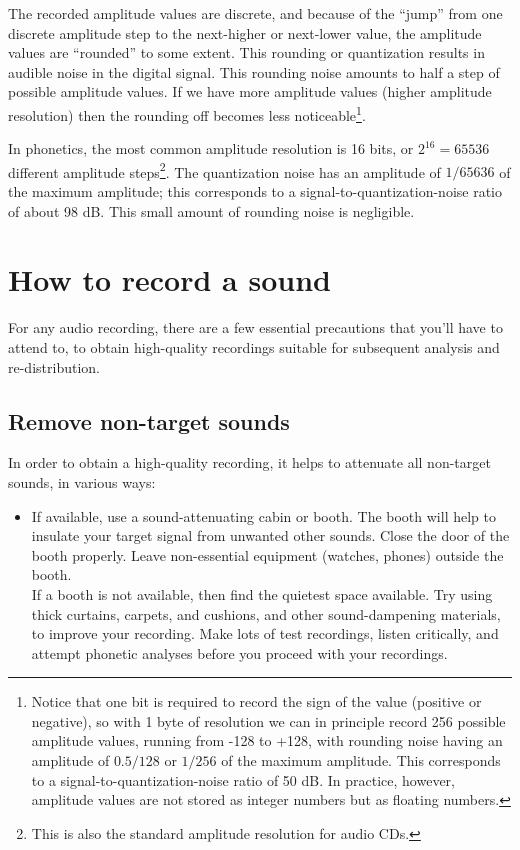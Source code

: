\documentclass[
]{book}
\providecommand{\tightlist}{%
  \setlength{\itemsep}{0pt}\setlength{\parskip}{0pt}}
\begin{document}
The recorded amplitude values are discrete, and because of the ``jump'' from one discrete amplitude step to the next-higher or next-lower value, the amplitude values are ``rounded'' to some extent. This rounding or quantization results in audible noise in the digital signal. This rounding noise amounts to half a step of possible amplitude values. If we have more amplitude values (higher amplitude resolution) then the rounding off becomes less noticeable\footnote{Notice that one bit is required to record the sign of the value (positive or negative), so with 1 byte of resolution we can in principle record 256 possible amplitude values, running from -128 to +128, with rounding noise having an amplitude of \(0.5/128\) or \(1/256\) of the maximum amplitude. This corresponds to a signal-to-quantization-noise ratio of 50 dB. In practice, however, amplitude values are not stored as integer numbers but as floating numbers.}.

In phonetics, the most common amplitude resolution is 16 bits, or \(2^{16} = 65536\) different amplitude steps\footnote{This is also the standard amplitude resolution for audio CDs.}. The quantization noise has an amplitude of \(1/65636\) of the maximum amplitude; this corresponds to a signal-to-quantization-noise ratio of about 98 dB. This small amount of rounding noise is negligible.

\section{How to record a sound}\label{how-to-record-a-sound}

For any audio recording, there are a few essential precautions that you'll have to attend to, to obtain high-quality recordings suitable for subsequent analysis and re-distribution.

\label{recording}
\subsection{Remove non-target sounds}\label{remove-non-target-sounds}

In order to obtain a high-quality recording, it helps to attenuate all non-target sounds, in various ways:

\begin{itemize}
\tightlist
\item
  If available, use a sound-attenuating cabin or booth. The booth will help to insulate your target signal from unwanted other sounds. Close the door of the booth properly. Leave non-essential equipment (watches, phones) outside the booth.\\
  If a booth is not available, then find the quietest space available. Try using thick curtains, carpets, and cushions, and other sound-dampening materials, to improve your recording. Make lots of test recordings, listen critically, and attempt phonetic analyses before you proceed with your recordings.
\end{itemize}
\end{document}
